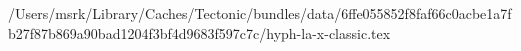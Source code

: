 /Users/msrk/Library/Caches/Tectonic/bundles/data/6ffe055852f8faf66c0acbe1a7fb27f87b869a90bad1204f3bf4d9683f597c7c/hyph-la-x-classic.tex